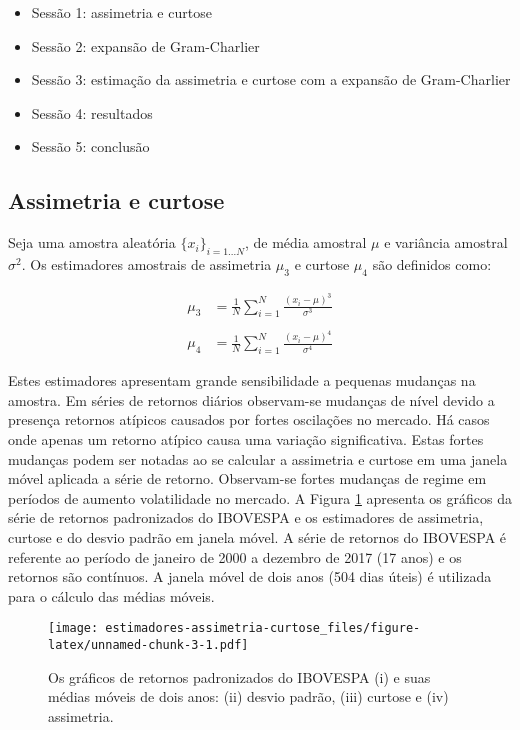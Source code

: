 \documentclass[]{article}
\providecommand{\tightlist}{%
  \setlength{\itemsep}{0pt}\setlength{\parskip}{0pt}}
\begin{document}
\begin{itemize}
\tightlist
\item
  Sessão 1: assimetria e curtose
\item
  Sessão 2: expansão de Gram-Charlier
\item
  Sessão 3: estimação da assimetria e curtose com a expansão de
  Gram-Charlier
\item
  Sessão 4: resultados
\item
  Sessão 5: conclusão
\end{itemize}

\subsection{Assimetria e curtose}\label{assimetria-e-curtose}

Seja uma amostra aleatória \(\{x_i\}_{i=1...N}\), de média amostral
\(\mu\) e variância amostral \(\sigma^2\). Os estimadores amostrais de
assimetria \(\mu_3\) e curtose \(\mu_4\) são definidos como:

\[
\begin{split}
\mu_3 & = \frac{1}{N} \sum_{i=1}^{N} \frac{(x_i - \mu)^3}{\sigma^3} \\ \\
\mu_4 & = \frac{1}{N} \sum_{i=1}^{N} \frac{(x_i - \mu)^4}{\sigma^4}
\end{split}
\]

Estes estimadores apresentam grande sensibilidade a pequenas mudanças na
amostra. Em séries de retornos diários observam-se mudanças de nível
devido a presença retornos atípicos causados por fortes oscilações no
mercado. Há casos onde apenas um retorno atípico causa uma variação
significativa. Estas fortes mudanças podem ser notadas ao se calcular a
assimetria e curtose em uma janela móvel aplicada a série de retorno.
Observam-se fortes mudanças de regime em períodos de aumento
volatilidade no mercado. A Figura \ref{fig:skewness-kurtosis-ma}
apresenta os gráficos da série de retornos padronizados do IBOVESPA e os
estimadores de assimetria, curtose e do desvio padrão em janela móvel. A
série de retornos do IBOVESPA é referente ao período de janeiro de 2000
a dezembro de 2017 (17 anos) e os retornos são contínuos. A janela móvel
de dois anos (504 dias úteis) é utilizada para o cálculo das médias
móveis.

\begin{figure}
\centering
\texttt{[image: estimadores-assimetria-curtose\_files/figure-latex/unnamed-chunk-3-1.pdf]}
\caption{\label{fig:skewness-kurtosis-ma} Os gráficos de retornos
padronizados do IBOVESPA (i) e suas médias móveis de dois anos: (ii)
desvio padrão, (iii) curtose e (iv) assimetria.}
\end{figure}
\end{document}
